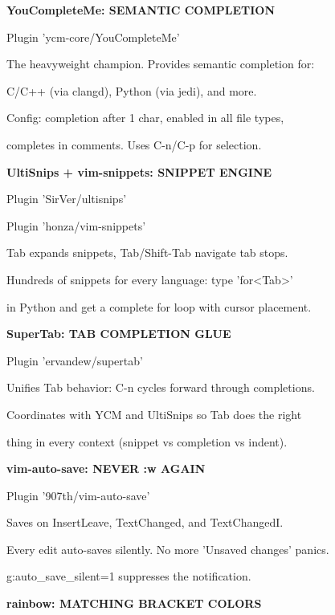 \documentclass[11pt,a4paper,twoside]{book}
\begin{document}
\vspace{12pt}
{\bfseries\color{neonyellow} YouCompleteMe: SEMANTIC COMPLETION}\vspace{4pt}

Plugin 'ycm-core/YouCompleteMe'

The heavyweight champion. Provides semantic completion for:

C/C++ (via clangd), Python (via jedi), and more.

Config: completion after 1 char, enabled in all file types,

completes in comments. Uses C-n/C-p for selection.


\vspace{12pt}
{\bfseries\color{neonyellow} UltiSnips + vim-snippets: SNIPPET ENGINE}\vspace{4pt}

Plugin 'SirVer/ultisnips'

Plugin 'honza/vim-snippets'

Tab expands snippets, Tab/Shift-Tab navigate tab stops.

Hundreds of snippets for every language: type 'for<Tab>'

in Python and get a complete for loop with cursor placement.


\vspace{12pt}
{\bfseries\color{neonyellow} SuperTab: TAB COMPLETION GLUE}\vspace{4pt}

Plugin 'ervandew/supertab'

Unifies Tab behavior: C-n cycles forward through completions.

Coordinates with YCM and UltiSnips so Tab does the right

thing in every context (snippet vs completion vs indent).


\vspace{12pt}
{\bfseries\color{neonyellow} vim-auto-save: NEVER :w AGAIN}\vspace{4pt}

Plugin '907th/vim-auto-save'

Saves on InsertLeave, TextChanged, and TextChangedI.

Every edit auto-saves silently. No more 'Unsaved changes' panics.

g:auto\_save\_silent=1 suppresses the notification.


\vspace{12pt}
{\bfseries\color{neonyellow} rainbow: MATCHING BRACKET COLORS}\vspace{4pt}
\end{document}
